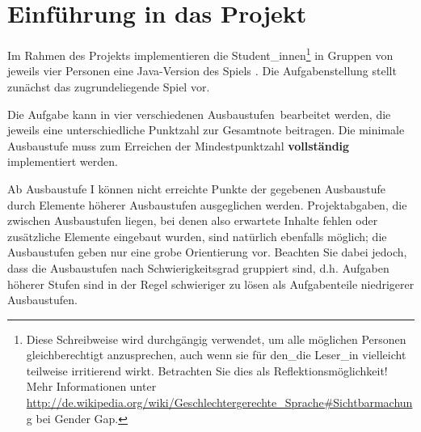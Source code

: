 \section{Einführung in das Projekt}
\label{sec:intro}

Im Rahmen des Projekts implementieren die Student\_innen\footnote{Diese Schreibweise wird durchg\"angig verwendet, um alle m\"oglichen Personen gleichberechtigt anzusprechen, auch wenn sie
f\"ur den\_die Leser\_in vielleicht teilweise irritierend wirkt. Betrachten Sie dies als Reflektionsm\"oglichkeit! Mehr Informationen unter 
\url{http://de.wikipedia.org/wiki/Geschlechtergerechte_Sprache\#Sichtbarmachung} bei \glqq{}Gender Gap\grqq{}.}
in Gruppen von jeweils vier Personen eine Java-Version des Spiels \emph{\gameTitle.} Die Aufgabenstellung stellt zun\"achst das zugrundeliegende Spiel vor.

Die Aufgabe kann in vier verschiedenen \glqq Ausbaustufen\grqq\ bearbeitet werden, die jeweils eine unterschiedliche Punktzahl zur Gesamtnote beitragen. Die minimale Ausbaustufe muss zum Erreichen der Mindestpunktzahl \textbf{vollst\"andig} implementiert werden.

Ab Ausbaustufe I können nicht erreichte Punkte der gegebenen Ausbaustufe durch Elemente h\"oherer Ausbaustufen \glqq{}ausgeglichen\grqq{} werden. Projektabgaben, die \glqq{}zwischen\grqq{} Ausbaustufen liegen, bei denen also erwartete Inhalte fehlen oder zusätzliche Elemente eingebaut wurden, sind natürlich ebenfalls möglich; die Ausbaustufen geben nur eine grobe Orientierung vor. Beachten Sie dabei jedoch, dass die Ausbaustufen nach Schwierigkeitsgrad gruppiert sind, d.h.  Aufgaben h\"oherer Stufen sind in der Regel schwieriger zu l\"osen als Aufgabenteile niedrigerer Ausbaustufen.

